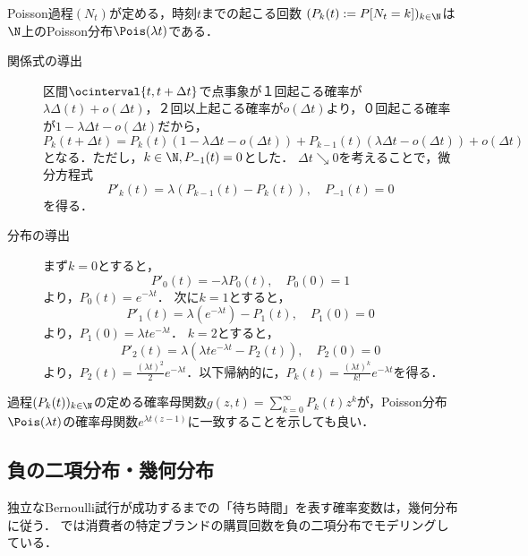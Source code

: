 \documentclass[uplatex,dvipdfmx]{jsreport}
\begin{document}
\begin{proposition}[Poisson過程の計数的性質]
    Poisson過程$(N_t)$が定める，時刻$t$までの起こる回数
    $(P_k(t):=P[N_t=k])_{k\in\N}$は$\N$上のPoisson分布$\Pois(\lambda t)$である．
\end{proposition}
\begin{Proof}\mbox{}
    \begin{description}
        \item[関係式の導出] 区間$\ocinterval{t,t+\Delta t}$で点事象が１回起こる確率が$\lambda\Delta(t)+o(\Delta t)$，２回以上起こる確率が$o(\Delta t)$より，０回起こる確率が$1-\lambda\Delta t-o(\Delta t)$だから，
        \[P_k(t+\Delta t)=P_k(t)(1-\lambda\Delta t-o(\Delta t))+P_{k-1}(t)(\lambda\Delta t-o(\Delta t))+o(\Delta t)\]
        となる．ただし，$k\in\N,P_{-1}(t)=0$とした．
        $\Delta t\searrow 0$を考えることで，微分方程式
        \[P'_k(t)=\lambda(P_{k-1}(t)-P_k(t)),\quad P_{-1}(t)=0\]
        を得る．
        \item[分布の導出]
        まず$k=0$とすると，
        \[P'_0(t)=-\lambda P_0(t),\quad P_0(0)=1\]
        より，$P_0(t)=e^{-\lambda t}$．
        次に$k=1$とすると，
        \[P'_1(t)=\lambda(e^{-\lambda t})-P_1(t),\quad P_1(0)=0\]
        より，$P_1(0)=\lambda te^{-\lambda t}$．
        $k=2$とすると，
        \[P'_2(t)=\lambda(\lambda te^{-\lambda t}-P_2(t)),\quad P_2(0)=0\]
        より，$P_2(t)=\frac{(\lambda t)^2}{2}e^{-\lambda t}$．以下帰納的に，$P_k(t)=\frac{(\lambda t)^k}{k!}e^{-\lambda t}$を得る．
    \end{description}
\end{Proof}
\begin{Proof}
    過程$(P_k(t))_{k\in\N}$の定める確率母関数$g(z,t)=\sum^\infty_{k=0}P_k(t)z^k$が，Poisson分布$\Pois(\lambda t)$の確率母関数$e^{\lambda t(z-1)}$に一致することを示しても良い．
\end{Proof}

\subsection{負の二項分布・幾何分布}

\begin{tcolorbox}[colframe=ForestGreen, colback=ForestGreen!10!white,breakable,colbacktitle=ForestGreen!40!white,coltitle=black,fonttitle=\bfseries\sffamily,
title=]
    独立なBernoulli試行が成功するまでの「待ち時間」を表す確率変数は，幾何分布に従う．
    \cite{森岡-今西16-確率思考の戦略論}では消費者の特定ブランドの購買回数を負の二項分布でモデリングしている．
\end{tcolorbox}
\end{document}
